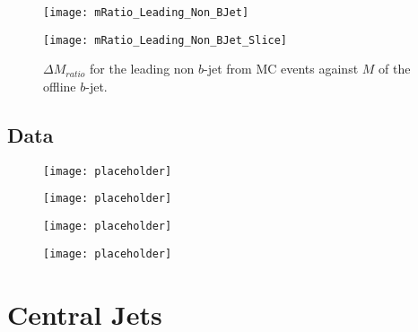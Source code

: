 		\begin{figure}[h]
			\centering

			\begin{minipage}[h]{0.33\linewidth}
				\texttt{[image: mRatio\_Leading\_Non\_BJet]}
			\end{minipage}
			\quad
			\begin{minipage}[h]{0.33\linewidth}
				\texttt{[image: mRatio\_Leading\_Non\_BJet\_Slice]}
			\end{minipage}
			\caption{$\Delta M_{ratio}$ for the leading \pt non $b$-jet from MC events against $M$ of the offline $b$-jet. }
			\label{fig:MC:nonleadingbm}
		\end{figure}

	\newpage
	\subsection{Data}

		\begin{figure}[h]
			\centering

			\begin{minipage}[h]{0.33\linewidth}
				\texttt{[image: placeholder]}
				\caption{}
				\label{fig:D:leadingnonbpt}
			\end{minipage}
			\quad
			\begin{minipage}[h]{0.33\linewidth}
				\texttt{[image: placeholder]}
				\caption{}
				\label{fig:D:leadingnonbeta}
			\end{minipage}
		\end{figure}

		\begin{figure}[h]
			\centering

			\begin{minipage}[h]{0.33\linewidth}
				\texttt{[image: placeholder]}
				\caption{}
				\label{fig:D:leadingnonbphi}
			\end{minipage}
			\quad
			\begin{minipage}[h]{0.33\linewidth}
				\texttt{[image: placeholder]}
				\caption{}
				\label{fig:D:leadingnonbm}
			\end{minipage}
		\end{figure}

		\newpage
\section{Central Jets}

